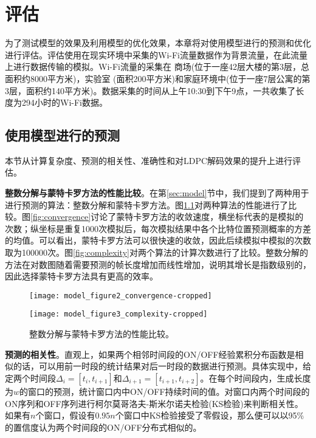 
\chapter{评估}
\label{chap:evaluation}

为了测试模型的效果及利用模型的优化效果，本章将对使用模型进行的预测和优化进行评估。评估使用在现实环境中采集的Wi-Fi流量数据作为背景流量，在此流量上进行数据传输的模拟。Wi-Fi流量的采集在
商场(位于一座42层大楼的第3层，总面积约8000平方米)，实验室
(面积200平方米)和家庭环境中(位于一座7层公寓的第3层，面积约140平方米)。数据采集的时间从上午10:30到下午9点，一共收集了长度为294小时的Wi-Fi数据。
\section{使用模型进行的预测}
本节从计算复杂度、预测的相关性、准确性和对LDPC解码效果的提升上进行评估。

\textbf{整数分解与蒙特卡罗方法的性能比较}。在第\ref{sec:model}节中，我们提到了两种用于进行预测的算法：整数分解和蒙特卡罗方法。图\ref{fig:predict_comparison}对两种算法的性能进行了比较。图\ref{fig:convergence}讨论了蒙特卡罗方法的收敛速度，横坐标代表的是模拟的次数；纵坐标是重复1000次模拟后，每次模拟结果中各个比特位置预测概率的方差的均值。可以看出，蒙特卡罗方法可以很快速的收敛，因此后续模拟中模拟的次数取为100000次。图\ref{fig:complexity}对两个算法的计算次数进行了比较。整数分解的方法在对数图随着需要预测的帧长度增加而线性增加，说明其增长是指数级别的，因此选择蒙特卡罗方法具有更高的效率。
\begin{figure}[b]
	\begin{minipage}[b]{.5\linewidth}
		\texttt{[image: model\_figure2\_convergence-cropped]}
		\label{fig:convergence}
	\end{minipage}
	\hfill
	\begin{minipage}[b]{.5\linewidth}
		\texttt{[image: model\_figure3\_complexity-cropped]}
		\label{fig:complexity}
	\end{minipage}
	\caption{整数分解与蒙特卡罗方法的性能比较。}\label{fig:predict_comparison}
\end{figure}

\textbf{预测的相关性}。直观上，如果两个相邻时间段的ON/OFF经验累积分布函数是相似的话，可以用前一时段的统计结果对后一时段的数据进行预测。具体实现中，给定两个时间段$\Delta_i = [t_i, t_{i+1}]$和$\Delta_{i+1} = [t_{i+1}, t_{i+2}]$。在每个时间段内，生成长度为$w$的窗口的预测，统计窗口内中ON/OFF持续时间的值。对窗口内两个时间段的ON序列和OFF序列进行柯尔莫哥洛夫-斯米尔诺夫检验(KS检验)来判断相关性。如果有$n$个窗口，假设有$0.95n$个窗口中KS检验接受了零假设，那么便可以以95\%的置信度认为两个时间段的ON/OFF分布式相似的。

